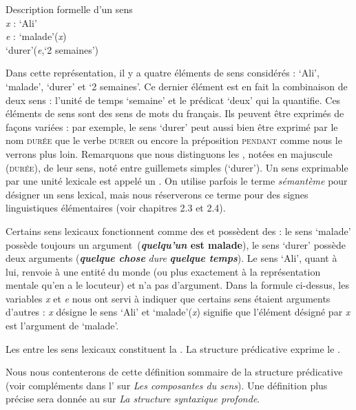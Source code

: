 \ea Description formelle d’un sens\\
\textit{x} : ‘Ali’\\
\textit{e} : ‘malade’(\textit{x})\\
‘durer’(\textit{e},‘2 semaines’)
\z

Dans cette représentation, il y a quatre éléments de sens considérés : ‘Ali’, ‘malade’, ‘durer’ et ‘2 semaines’. Ce dernier élément est en fait la combinaison de deux sens : l’unité de temps ‘semaine’ et le prédicat ‘deux’ qui la quantifie. Ces éléments de sens sont des sens de mots du français. Ils peuvent être exprimés de façons variées : par exemple, le sens ‘durer’ peut aussi bien être exprimé par le nom \textsc{durée} que le verbe \textsc{durer} ou encore la préposition \textsc{pendant} comme nous le verrons plus loin. Remarquons que nous distinguons les , notées en majuscule (\textsc{durée}), de leur sens, noté entre guillemets simples (‘durer’). Un sens exprimable par une unité lexicale est appelé un . On utilise parfois le terme \textit{sémantème} pour désigner un sens lexical, mais nous réserverons ce terme pour des signes linguistiques élémentaires (voir chapitres 2.3 et 2.4).

Certains sens lexicaux fonctionnent comme des  et possèdent des  : le sens ‘malade’ possède toujours un argument~(\textbf{\textit{quelqu’un} est malade}), le sens ‘durer’ possède deux arguments (\textbf{\textit{quelque chose}} \textit{dure} \textbf{\textit{quelque temps}}). Le sens ‘Ali’, quant à lui, renvoie à une entité du monde (ou plus exactement à la représentation mentale qu’en a le locuteur) et n’a pas d’argument. Dans la formule ci-dessus, les variables \textit{x} et \textit{e} nous ont servi à indiquer que certains sens étaient arguments d’autres : \textit{x} désigne le sens ‘Ali’ et ‘malade’(\textit{x}) signifie que l’élément désigné par \textit{x} est l’argument de ‘malade’.

{Les  entre les sens lexicaux constituent la . La structure prédicative exprime le .}

Nous nous contenterons de cette définition sommaire de la structure prédicative (voir compléments dans l’ sur \textit{Les composantes du sens}). Une définition plus précise sera donnée au  sur \textit{La structure syntaxique profonde}.

